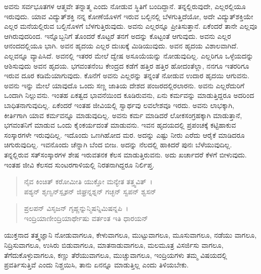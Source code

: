 ಅವನು ಸರ್ವಭೂತಗಳ ಆತ್ಮವೇ ತನ್ನಾತ್ಮ ಎಂದು ನೋಡುವ ಸ್ಥಿತಿಗೆ ಬಂದಿದ್ದಾನೆ. ತನ್ನಲ್ಲಿರುವುದೇ, ಎಲ್ಲರಲ್ಲಿಯೂ ಇರುವುದು. ಯಾವ ವಿದ್ಯುತ್​ಶಕ್ತಿ ನನ್ನ ಕೋಣೆಯೊಳಗೆ ಇರುವ ಬಲ್ಬಿನಲ್ಲಿ ಬೆಳಗುತ್ತಿದೆಯೋ, ಅದೇ ವಿದ್ಯುತ್​ಶಕ್ತಿಯೇ ಎಲ್ಲರ ಮನೆಯಲ್ಲಿರುವ ಬಲ್ಬಿನೊಳಗೆ ಬೆಳಗುತ್ತಿರುವುದು. ಅವನು ಎಲ್ಲರನ್ನೂ ಪ್ರೀತಿಸುತ್ತಾನೆ. ಏಕೆಂದರೆ ತಾನೇ ಎಲ್ಲವೂ ಆಗಿರುವುದರಿಂದ. ಇನ್ನೊಬ್ಬನಿಗೆ ತೊಂದರೆ ಕೊಟ್ಟರೆ ತನಗೆ ಅದನ್ನು ಕೊಟ್ಟಂತೆ ಆಗುವುದು. ಅವನು ಎಲ್ಲರ ಆನಂದದಲ್ಲಿಯೂ ಭಾಗಿ. ಅವನ ಹೃದಯ ಎಲ್ಲರ ದುಃಖಕ್ಕೆ ಮಿಡಿಯುವುದು. ಅವನ ಹೃದಯ ವಿಶಾಲವಾಗಿದೆ. ಎಲ್ಲವನ್ನೂ ವ್ಯಾಪಿಸಿದೆ. ಅವನಲ್ಲಿ ಇತರರ ಮೇಲೆ ದ್ವೇಷ ಅಸೂಯೆಯನ್ನು ನೋಡುವುದಿಲ್ಲ. ಎಲ್ಲರಿಗೂ ಒಳ್ಳೆಯದನ್ನು ಆಶಿಸುವುದು ಅವನ ಹೃದಯ. ಭಗವಂತನೆಂಬ ಕೇಂದ್ರದ ಕಡೆಗೆ ಹತ್ತಿರ ಹತ್ತಿರ ಹೋದಂತೆಲ್ಲಾ, ನನಗೂ ಇತರರಿಗೂ ಇರುವ ದೂರ ಕಡಿಮೆಯಾಗುವುದು. ಕೊನೆಗೆ ಅವನು ಎಲ್ಲರನ್ನು ತನ್ನಂತೆ ನೋಡುವ ಉದಾರ ಹೃದಯಿ ಆಗುವನು. ಅವನು ಇನ್ನು ಮೇಲೆ ಯಾವುದೊ ಒಂದು ಸಣ್ಣ ಜಾತಿಯ ದೇಶದ ಪಂಜರದಲ್ಲಿರಲಾರನು. ಅವನು ಎಲ್ಲರೆದುರಿಗೆ ಒಂದಾಗಿ ನಿಲ್ಲುವನು. ಇಂತಹ ಏಕತ್ವದ ಭಾವನೆಯಿಂದ ಕೂಡಿರುವನು, ಏನು ಕರ್ಮವನ್ನು ಮಾಡುತ್ತಿದ್ದರೂ ಅದರಿಂದ ಬಾಧಿತನಾಗುವುದಿಲ್ಲ. ಏಕೆಂದರೆ ಇಂತಹ ಜೀವಿಯಲ್ಲಿ ಸ್ವಾರ್ಥವು ಲವಲೇಶವೂ ಇರದು. ಅವನು ಲಾಭಕ್ಕಾಗಿ, ಕೀರ್ತಿಗಾಗಿ ಯಾವ ಕರ್ಮವನ್ನೂ ಮಾಡುವುದಿಲ್ಲ. ಅವನು ಕರ್ಮ ಮಾಡಿದರೆ ಲೋಕಸಂಗ್ರಹಕ್ಕಾಗಿ ಮಾಡುತ್ತಾನೆ, ಭಗವಂತನಿಗೆ ಮಾಡುವ ಒಂದು ಕೈಂಕರ್ಯದಂತೆ ಮಾಡುವನು. ಇವನ ಹೃದಯದಲ್ಲಿ ಪ್ರಪಂಚಕ್ಕೆ ಕಟ್ಟಿಹಾಕುವ ಸಂಸ್ಕಾರಗಳೇ ಇರುವುದಿಲ್ಲ. ಇದೊಂದು ಒಣಗಿಹೋದ ಮರ. ಅದನ್ನು ಎಷ್ಟು ನೀರು ಎರೆದು ಆರೈಕೆ ಮಾಡಿದರೂ ಚಿಗುರುವುದಿಲ್ಲ. ಇವನೊಂದು ಚೆನ್ನಾಗಿ ಬೆಂದ ಬೀಜ. ಅದನ್ನು ನೆಲದಲ್ಲಿ ಹಾಕಿದರೆ ಪುನಃ ಬೆಳೆಯುವುದಿಲ್ಲ. ತನ್ನಲ್ಲಿರುವ ಸತ್​ಸಂಸ್ಕಾರಗಳ ಶೇಷ ಇರುವತನಕ ಕೆಲಸ ಮಾಡುತ್ತಿರುವನು. ಅದು ಖರ್ಚಾದರೆ ಕೆಳಗೆ ಬೀಳುವುದು. ಇಂತಹ ಜೀವಿ ಕೆಲಸದ ಸುಂಟರಗಾಳಿಯಲ್ಲಿ ನಿರತನಾಗಿದ್ದರೂ ನಿರ್ಲಿಪ್ತ.

\begin{verse}
ನೈವ ಕಿಂಚಿತ್ ಕರೋಮೀತಿ ಯುಕ್ತೋ ಮನ್ಯೇತ ತತ್ತ್ವವಿತ್~।\\ಪಶ್ಯನ್ ಶೃಣ್ವನ್​ಸ್ಪೃಶನ್ ಜಿಘ್ರನ್ನಶ್ನನ್ ಗಚ್ಛನ್ ಸ್ವಪನ್ ಶ್ವಸನ್ 
\end{verse}

\begin{verse}
ಪ್ರಲಪನ್ ವಿಸೃಜನ್ ಗೃಹ್ಣನ್ನುನ್ಮಿಷನ್ನಿಮಿಷನ್ನಪಿ~।\\ಇಂದ್ರಿಯಾಣೀಂದ್ರಿಯಾರ್ಥೇಷು ವರ್ತಂತ ಇತಿ ಧಾರಯನ್ 
\end{verse}

{\small ಯುಕ್ತನಾದ ತತ್ತ್ವಜ್ಞಾನಿ ನೋಡುವಾಗಲೂ, ಕೇಳುವಾಗಲೂ, ಮುಟ್ಟುವಾಗಲೂ, ಮೂಸುವಾಗಲೂ, ನಡೆಯು ವಾಗಲೂ, ನಿದ್ರಿಸುವಾಗಲೂ, ಉಸಿರು ಬಿಡುವಾಗಲೂ, ಮಾತನಾಡುವಾಗಲೂ, ಮಲಮೂತ್ರ ವಿಸರ್ಜಿಸು ವಾಗಲೂ, ತೆಗೆದುಕೊಳ್ಳುವಾಗಲೂ, ಕಣ್ಣು ತೆರೆಯುವಾಗಲೂ, ಮುಚ್ಚುವಾಗಲೂ, ಇಂದ್ರಿಯಗಳು ತಮ್ಮ ವಿಷಯದಲ್ಲಿ ಪ್ರವರ್ತಿಸುತ್ತಿವೆ ಎಂದು ನಿಶ್ಚಯಿಸಿ, ತಾನು ಏನನ್ನೂ ಮಾಡುತ್ತಿಲ್ಲ ಎಂದು ತಿಳಿಯಬೇಕು.}

